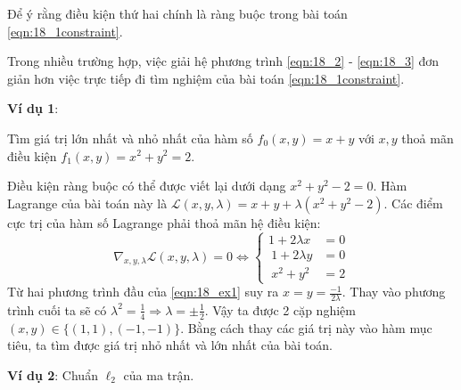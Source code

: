Để ý rằng điều kiện thứ hai chính là ràng buộc trong bài toán
\eqref{eqn:18_1constraint}.

Trong nhiều trường hợp, việc giải hệ phương trình \eqref{eqn:18_2} - \eqref{eqn:18_3} đơn giản hơn việc trực tiếp đi tìm nghiệm của bài toán
\eqref{eqn:18_1constraint}.

\textbf{Ví dụ 1}:

Tìm giá trị lớn nhất và nhỏ nhất của hàm số $f_0(x, y) = x + y$ với
$x, y$ thoả mãn điều kiện $f_1(x, y) = x^2 + y^2 = 2$.


\lg

Điều kiện ràng buộc có thể được viết lại dưới dạng $x^2 + y^2 - 2 = 0$.
Hàm Lagrange của bài toán này là $\mathcal{L}(x, y, \lambda) = x + y + \lambda(x^2 + y^2 - 2)$. Các điểm cực trị của hàm số Lagrange phải thoả mãn hệ điều kiện:
\begin{equation}
\label{eqn:18_ex1}
\nabla_{x, y, \lambda} \mathcal{L}(x, y, \lambda) = 0 \Leftrightarrow
\left\{
\begin{matrix}
1 + 2\lambda x &= 0 \\\
1 + 2\lambda y &= 0 \\\
x^2 + y^2 &=     2
\end{matrix}
\right.
\end{equation}
Từ hai phương trình đầu của \eqref{eqn:18_ex1} suy ra $x = y =
\frac{-1}{2\lambda}$. Thay vào phương trình cuối ta sẽ có $\lambda^2 =
\frac{1}{4} \Rightarrow \lambda = \pm \frac{1}{2}$. Vậy ta được 2 cặp nghiệm
$(x, y) \in \{(1, 1), (-1, -1)\}$. Bằng cách thay các giá trị này vào hàm mục
tiêu, ta tìm được giá trị nhỏ nhất và lớn nhất của bài toán.

\textbf{Ví dụ 2}: Chuẩn $\ell_2$ của ma trận.

